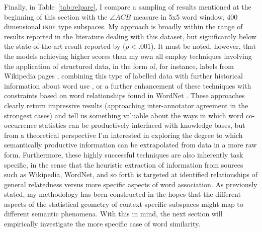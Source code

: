 Finally, in Table~\ref{tab:relpare}, I compare a sampling of results mentioned at the beginning of this section with the $\angle ACB$ measure in 5x5 word window, 400 dimensional \textsc{indy} type subspaces.  My approach is broadly within the range of results reported in the literature dealing with this dataset, but significantly below the state-of-the-art result reported by \cite{HalawiEA2012} ($p < .001$).  It must be noted, however, that the models achieving higher scores than my own all employ techniques involving the application of structured data, in the form of, for instance, labels from Wikipedia pages \citep{GabrilovichEA2007}, combining this type of labelled data with further historical information about word use \citep{RadinskyEA2011}, or a further enhancement of these techniques with constraints based on word relationships found in WordNet \citep{HalawiEA2012}.  These approaches clearly return impressive results (approaching inter-annotator agreement in the strongest cases) and tell us something valuable about the ways in which word co-occurrence statistics can be productively interfaced with knowledge bases, but from a theoretical perspective I'm interested in exploring the degree to which semantically productive information can be extrapolated from data in a more raw form.  Furthermore, these highly successful techniques are also inherently task specific, in the sense that the heuristic extraction of information from sources such as Wikipedia, WordNet, and so forth is targeted at identified relationships of general relatedness versus more specific aspects of word association.  As previously stated, my methodology has been constructed in the hopes that the different aspects of the statistical geometry of context specific subspaces might map to different semantic phenomena.  With this in mind, the next section will empirically investigate the more specific case of word similarity.


